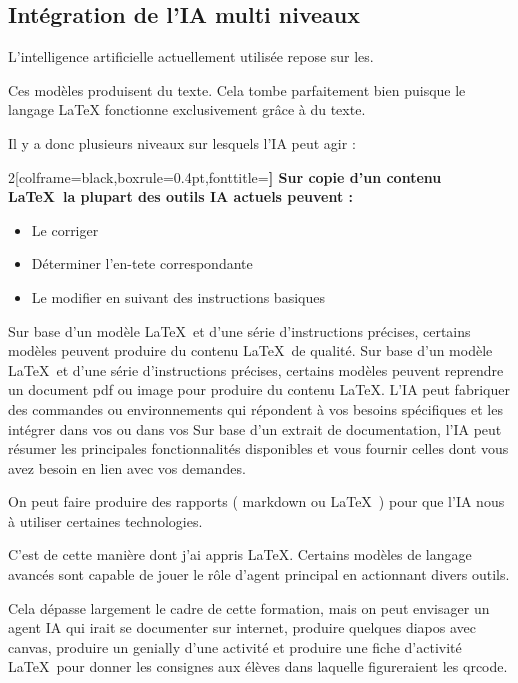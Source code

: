 \subsection{Intégration de l'IA multi niveaux}

L'intelligence artificielle actuellement utilisée repose sur les. 

Ces modèles produisent du texte. Cela tombe parfaitement bien puisque le langage LaTeX fonctionne exclusivement grâce à du texte. 

Il y a donc plusieurs niveaux sur lesquels l'IA peut agir : 

\begin{MultiColonnes}{2}[colframe=black,boxrule=0.4pt,fonttitle=\bfseries]%
    \tcbitem[title=Debuguer] Sur copie d'un contenu \LaTeX\ la plupart des outils IA actuels peuvent : 
    \begin{itemize}[label=$\bullet$]
        \item Le corriger
        \item Déterminer l'en-tete correspondante
        \item Le modifier en suivant des instructions basiques
    \end{itemize}
    \tcbitem[title=Produire du contenu] Sur base d'un modèle \LaTeX\ et d'une série d'instructions précises, certains modèles peuvent produire du contenu \LaTeX\ de qualité. 
    \tcbitem[title=Recopier du contenu] Sur base d'un modèle \LaTeX\ et d'une série d'instructions précises, certains modèles peuvent reprendre un document pdf ou image pour produire du contenu \LaTeX. 
    \tcbitem[title=Créer des packages] L'IA peut fabriquer des commandes ou environnements qui répondent à vos besoins spécifiques et les intégrer dans vos  ou dans vos 
    \tcbitem[title=Agent formateur] Sur base d'un extrait de documentation, l'IA peut résumer les principales fonctionnalités disponibles et vous fournir celles dont vous avez besoin en lien avec vos demandes. 

    On peut faire produire des rapports ( markdown ou \LaTeX\ ) pour que l'IA nous  à utiliser certaines technologies. 

    C'est de cette manière dont j'ai appris \LaTeX. 
    \tcbitem[title=Agent modérateur] Certains modèles de langage avancés sont capable de jouer le rôle d'agent principal en actionnant divers outils. 
    
    Cela dépasse largement le cadre de cette formation, mais on peut envisager un agent IA qui irait se documenter sur internet, produire quelques diapos avec canvas, produire un genially d'une activité et produire une fiche d'activité \LaTeX\ pour donner les consignes aux élèves dans laquelle figureraient les qrcode. 
\end{MultiColonnes}



